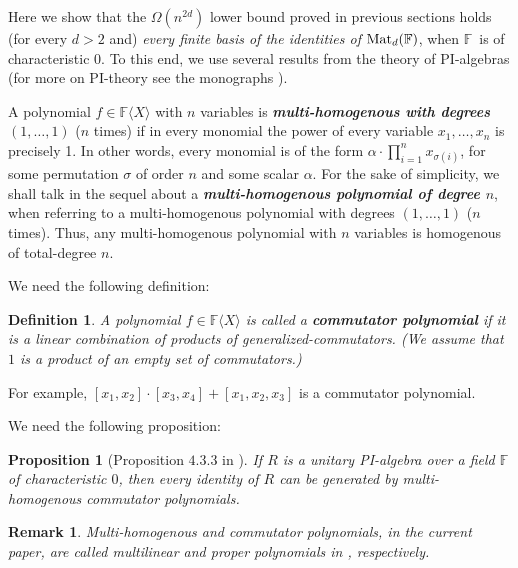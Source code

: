 \documentclass[12pt,reqno]{article}
\newtheorem{definition}{Definition}
\newtheorem{proposition}[theorem]{Proposition}
\newtheorem*{remark*}{Remark}
\newcommand\F{\ensuremath{\mathbb F}}
\newcommand{\cd}{\cdot}
\newcommand{\matd}{{\ensuremath{{\rm Mat}_d(\F)}}}
\newcommand{\freea}{\ensuremath{\F\langle X\rangle}}
\begin{document}

Here we show that the $\Omega(n^{2d})$ lower bound proved in previous sections holds (for every $d>2$ and) \emph{every  finite basis of the identities of \matd}, when \F\ is of characteristic $0$.
To this end, we use several results from the theory of PI-algebras (for more on PI-theory see the monographs \cite{Row80,Dre99}).


A polynomial $f\in \freea$ with $n$ variables is \textbf{\emph{multi-homogenous with degrees $(1,\ldots,1)$}} ($n$ times) if in every monomial the power of every variable $x_1,\ldots,x_n$ is precisely 1. In other words, every monomial is of the form $\alpha\cd \prod _{i=1}^n x_{\sigma(i)}$, for some permutation $\sigma$ of order $n$ and some scalar $\alpha$. For the sake of simplicity, we shall talk in the sequel about a \textit{\textbf{multi-homogenous polynomial of degree $n$}}, when referring to a multi-homogenous polynomial with degrees $(1,\ldots,1)$ ($n$ times). Thus, any multi-homogenous polynomial with $n$ variables is homogenous of total-degree  $n$.


We need the following definition:%


\begin{definition}\label{def:commutator_identity}
A polynomial $f\in \freea$ is called a \textbf{commutator polynomial} if it is a linear combination of products of generalized-commutators.
(We assume that $1$ is a product of an empty set of commutators.) \end{definition}
For example, $[x_1,x_2]\cd[x_3,x_4]+[x_1,x_2,x_3]$ is a commutator polynomial.


We need the following proposition:
\begin{proposition}[Proposition $4.3.3$ in \cite{Dre99}]
\label{prop:generated-by-multi-commutator-polynomial}
   If $R$ is a unitary PI-algebra over a field $\F$ of characteristic $0$, then every identity of $R$ can be generated by  multi-homogenous commutator  polynomials.
\end{proposition}
\begin{remark*}
\emph{Multi-homogenous} and \emph{commutator polynomials}, in the current paper, are called \emph{multilinear} and \emph{proper polynomials} in \cite{Dre99}, respectively.
\end{remark*}
\end{document}
